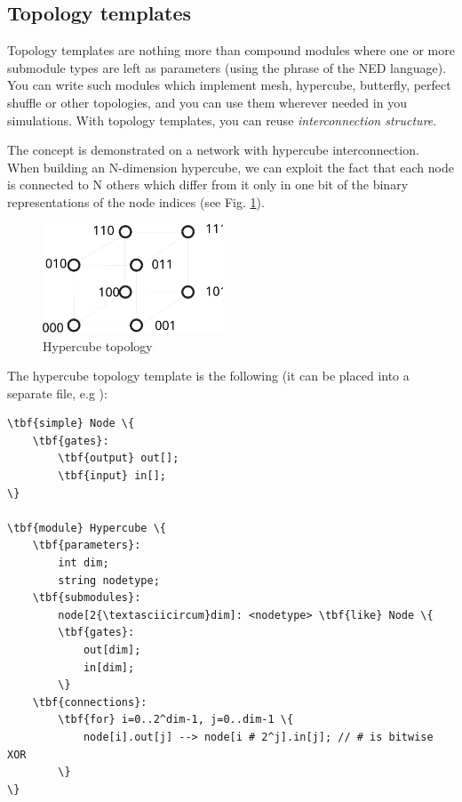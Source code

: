 \subsection{Topology templates}
\label{sec:ch-ned-lang:topology-templates}

Topology templates are nothing more than compound modules where one or
more submodule types are left as parameters (using the
 phrase of the NED language).  You can
write such modules which implement mesh,
hypercube,
butterfly, perfect
shuffle or other topologies, and you
can use them wherever needed in you simulations.  With topology
templates, you can reuse
\textit{interconnection structure}.


The concept is demonstrated on a network with hypercube interconnection.
When building an N-dimension hypercube, we can exploit the fact
that each node is connected to N others which differ from it
only in one bit of the binary representations of the node indices
(see Fig. \ref{fig:ch-ned-lang:hypercube-topology}).

\begin{figure}[htbp]
  \begin{center}
    \includegraphics[width=2.111in, height=1.285in]{figures/hypercube}
    \caption{Hypercube topology}
    \label{fig:ch-ned-lang:hypercube-topology}
  \end{center}
\end{figure}


The hypercube topology template is the
following (it can be placed into a separate file, e.g ):

\begin{Verbatim}[commandchars=\\\{\}]
\tbf{simple} Node \{
    \tbf{gates}:
        \tbf{output} out[];
        \tbf{input} in[];
\}

\tbf{module} Hypercube \{
    \tbf{parameters}:
        int dim;
        string nodetype;
    \tbf{submodules}:
        node[2{\textasciicircum}dim]: <nodetype> \tbf{like} Node \{
        \tbf{gates}:
            out[dim];
            in[dim];
        \}
    \tbf{connections}:
        \tbf{for} i=0..2^dim-1, j=0..dim-1 \{
            node[i].out[j] --> node[i # 2^j].in[j]; // # is bitwise XOR
        \}
\}
\end{Verbatim}


